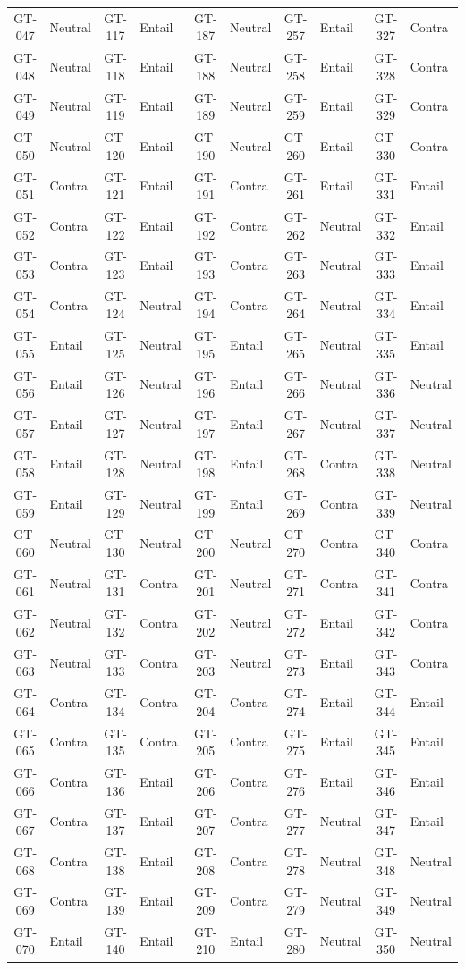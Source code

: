 \begin{longtable}{@{} c l @{\hspace{10pt}} c l @{\hspace{10pt}} c l @{\hspace{10pt}} c l @{\hspace{10pt}} c l @{}}
GT-047 & Neutral & GT-117 & Entail & GT-187 & Neutral & GT-257 & Entail & GT-327 & Contra \\
GT-048 & Neutral & GT-118 & Entail & GT-188 & Neutral & GT-258 & Entail & GT-328 & Contra \\
GT-049 & Neutral & GT-119 & Entail & GT-189 & Neutral & GT-259 & Entail & GT-329 & Contra \\
GT-050 & Neutral & GT-120 & Entail & GT-190 & Neutral & GT-260 & Entail & GT-330 & Contra \\
GT-051 & Contra & GT-121 & Entail & GT-191 & Contra & GT-261 & Entail & GT-331 & Entail \\
GT-052 & Contra & GT-122 & Entail & GT-192 & Contra & GT-262 & Neutral & GT-332 & Entail \\
GT-053 & Contra & GT-123 & Entail & GT-193 & Contra & GT-263 & Neutral & GT-333 & Entail \\
GT-054 & Contra & GT-124 & Neutral & GT-194 & Contra & GT-264 & Neutral & GT-334 & Entail \\
GT-055 & Entail & GT-125 & Neutral & GT-195 & Entail & GT-265 & Neutral & GT-335 & Entail \\
GT-056 & Entail & GT-126 & Neutral & GT-196 & Entail & GT-266 & Neutral & GT-336 & Neutral \\
GT-057 & Entail & GT-127 & Neutral & GT-197 & Entail & GT-267 & Neutral & GT-337 & Neutral \\
GT-058 & Entail & GT-128 & Neutral & GT-198 & Entail & GT-268 & Contra & GT-338 & Neutral \\
GT-059 & Entail & GT-129 & Neutral & GT-199 & Entail & GT-269 & Contra & GT-339 & Neutral \\
GT-060 & Neutral & GT-130 & Neutral & GT-200 & Neutral & GT-270 & Contra & GT-340 & Contra \\
GT-061 & Neutral & GT-131 & Contra & GT-201 & Neutral & GT-271 & Contra & GT-341 & Contra \\
GT-062 & Neutral & GT-132 & Contra & GT-202 & Neutral & GT-272 & Entail & GT-342 & Contra \\
GT-063 & Neutral & GT-133 & Contra & GT-203 & Neutral & GT-273 & Entail & GT-343 & Contra \\
GT-064 & Contra & GT-134 & Contra & GT-204 & Contra & GT-274 & Entail & GT-344 & Entail \\
GT-065 & Contra & GT-135 & Contra & GT-205 & Contra & GT-275 & Entail & GT-345 & Entail \\
GT-066 & Contra & GT-136 & Entail & GT-206 & Contra & GT-276 & Entail & GT-346 & Entail \\
GT-067 & Contra & GT-137 & Entail & GT-207 & Contra & GT-277 & Neutral & GT-347 & Entail \\
GT-068 & Contra & GT-138 & Entail & GT-208 & Contra & GT-278 & Neutral & GT-348 & Neutral \\
GT-069 & Contra & GT-139 & Entail & GT-209 & Contra & GT-279 & Neutral & GT-349 & Neutral \\
GT-070 & Entail & GT-140 & Entail & GT-210 & Entail & GT-280 & Neutral & GT-350 & Neutral \\
\end{longtable}
